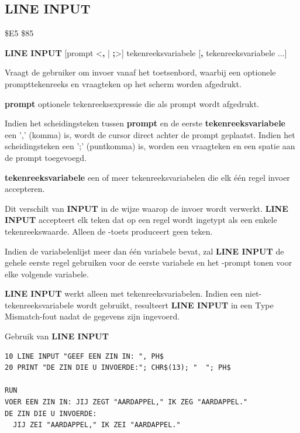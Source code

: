 
\newpage
\subsection{LINE INPUT}
\begin{description}[leftmargin=2cm,style=nextline]
\item [Token:]    \$E5 \$85
\item [Formaat:]   {\bf LINE INPUT} [prompt <{\bf,} | {\bf;}>] tekenreeksvariabele [{\bf,} tekenreeksvariabele ...]\item [Gebruik:]    Vraagt de gebruiker om invoer vanaf het toetsenbord, waarbij een optionele prompttekenreeks en vraagteken op het scherm worden afgedrukt.

                  {\bf prompt} optionele tekenreeksexpressie die als prompt wordt afgedrukt.

                  Indien het scheidingsteken tussen {\bf prompt} en de eerste {\bf tekenreeksvariabele} een ',' (komma) is, wordt de cursor direct achter de prompt geplaatst. Indien het scheidingsteken een ';' (puntkomma) is, worden een vraagteken en een spatie aan de prompt toegevoegd.

                  {\bf tekenreeksvariabele} een of meer tekenreeksvariabelen die elk één regel invoer accepteren.

\item [Opmerkingen:]  Dit verschilt van {\bf INPUT} in de wijze waarop de invoer wordt verwerkt. {\bf LINE INPUT} accepteert elk teken dat op een regel wordt ingetypt als een enkele tekenreekswaarde. Alleen de -toets produceert geen teken.

                  Indien de variabelenlijst meer dan één variabele bevat, zal {\bf LINE INPUT} de gehele eerste regel gebruiken voor de eerste variabele en het -prompt tonen voor elke volgende variabele.

                  {\bf LINE INPUT} werkt alleen met tekenreeksvariabelen. Indien een niet-tekenreeksvariabele wordt gebruikt, resulteert {\bf LINE INPUT} in een Type Mismatch-fout nadat de gegevens zijn ingevoerd.

\item [Voorbeeld:]  Gebruik van {\bf LINE INPUT}

\begin{tcolorbox}[colback=black,coltext=white]
\verbatimfont{\codefont}
\begin{verbatim}
10 LINE INPUT "GEEF EEN ZIN IN: ", PH$
20 PRINT "DE ZIN DIE U INVOERDE:"; CHR$(13); "  "; PH$

RUN
VOER EEN ZIN IN: JIJ ZEGT "AARDAPPEL," IK ZEG "AARDAPPEL."
DE ZIN DIE U INVOERDE:
  JIJ ZEI "AARDAPPEL," IK ZEI "AARDAPPEL."
\end{verbatim}
\end{tcolorbox}
\end{description}

